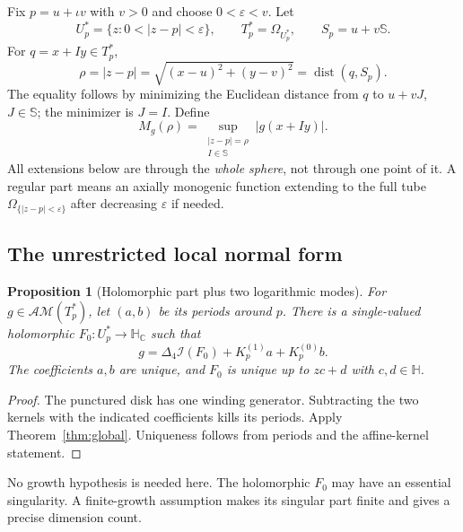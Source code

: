 \documentclass[11pt,a4paper]{article}
\numberwithin{equation}{section}
\newtheorem{proposition}[theorem]{Proposition}
\theoremstyle{definition}
\theoremstyle{remark}
\newcommand{\C}{\mathbb C}
\newcommand{\HH}{\mathbb H}
\newcommand{\HC}{\mathbb H_{\C}}
\newcommand{\SSS}{\mathbb S}
\newcommand{\AM}{\mathcal{AM}}
\newcommand{\cI}{\mathcal I}
\newcommand{\lap}{\Delta_4}
\newcommand{\Kzero}{K_p^{(0)}}
\newcommand{\Kone}{K_p^{(1)}}
\DeclareMathOperator{\dist}{dist}
\begin{document}
Fix $p=u+\iota v$ with $v>0$ and choose $0<\varepsilon<v$. Let
\begin{equation}\label{eq:tube}
 U_p^*=\{z:0<|z-p|<\varepsilon\},\qquad
 T_p^*=\Omega_{U_p^*},\qquad S_p=u+v\SSS.
\end{equation}
For $q=x+Iy\in T_p^*$,
\[
 \rho=|z-p|=\sqrt{(x-u)^2+(y-v)^2}=\dist(q,S_p).
\]
The equality follows by minimizing the Euclidean distance from $q$ to
$u+vJ$, $J\in\SSS$; the minimizer is $J=I$. Define
\begin{equation}\label{eq:M-rho}
 M_g(\rho)=\sup_{\substack{|z-p|=\rho\\ I\in\SSS}}|g(x+Iy)|.
\end{equation}
All extensions below are through the \emph{whole sphere}, not through one point
of it. A regular part means an axially monogenic function extending to the full
tube $\Omega_{\{|z-p|<\varepsilon\}}$ after decreasing $\varepsilon$ if needed.

\subsection{The unrestricted local normal form}
\begin{proposition}[Holomorphic part plus two logarithmic modes]
\label{prop:local-normal}
For $g\in\AM(T_p^*)$, let $(a,b)$ be its periods around $p$. There is a
single-valued holomorphic $F_0:U_p^*\to\HC$ such that
\begin{equation}\label{eq:unrestricted-normal}
 g=\lap\cI(F_0)+\Kone a+\Kzero b.
\end{equation}
The coefficients $a,b$ are unique, and $F_0$ is unique up to $zc+d$ with
$c,d\in\HH$.
\end{proposition}
\begin{proof}
The punctured disk has one winding generator. Subtracting the two kernels with
the indicated coefficients kills its periods. Apply Theorem~\ref{thm:global}.
Uniqueness follows from periods and the affine-kernel statement.
\end{proof}
No growth hypothesis is needed here. The holomorphic $F_0$ may have an
essential singularity. A finite-growth assumption makes its singular part
finite and gives a precise dimension count.
\end{document}
